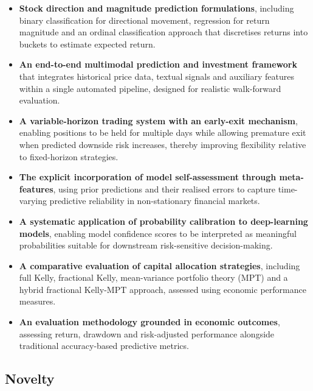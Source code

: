 \documentclass{l4proj}
\begin{document}
\begin{itemize}
    \item 
    \textbf{Stock direction and magnitude prediction formulations}, including binary classification for directional movement, regression for return magnitude and an ordinal classification approach that discretises returns into buckets to estimate expected return.

    \item 
    \textbf{An end-to-end multimodal prediction and investment framework} that integrates historical price data, textual signals and auxiliary features within a single automated pipeline, designed for realistic walk-forward evaluation.

    \item 
    \textbf{A variable-horizon trading system with an early-exit mechanism}, enabling positions to be held for multiple days while allowing premature exit when predicted downside risk increases, thereby improving flexibility relative to fixed-horizon strategies.

    \item 
    \textbf{The explicit incorporation of model self-assessment through meta-features}, using prior predictions and their realised errors to capture time-varying predictive reliability in non-stationary financial markets.

    \item 
    \textbf{A systematic application of probability calibration to deep-learning models}, enabling model confidence scores to be interpreted as meaningful probabilities suitable for downstream risk-sensitive decision-making.

    \item 
    \textbf{A comparative evaluation of capital allocation strategies}, including full Kelly, fractional Kelly, mean-variance portfolio theory (MPT) and a hybrid fractional Kelly-MPT approach, assessed using economic performance measures.

    \item 
    \textbf{An evaluation methodology grounded in economic outcomes}, assessing return, drawdown and risk-adjusted performance alongside traditional accuracy-based predictive metrics.
\end{itemize}

\subsection{Novelty}
\end{document}
